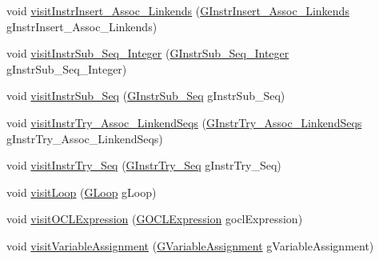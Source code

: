 \begin{DoxyCompactItemize}
\item 
void \hyperlink{interfaceorg_1_1tzi_1_1use_1_1gen_1_1assl_1_1statics_1_1_instruction_visitor_a6e62a3915d27cd213c38abfca067192c}{visit\-Instr\-Insert\-\_\-\-Assoc\-\_\-\-Linkends} (\hyperlink{classorg_1_1tzi_1_1use_1_1gen_1_1assl_1_1statics_1_1_g_instr_insert___assoc___linkends}{G\-Instr\-Insert\-\_\-\-Assoc\-\_\-\-Linkends} g\-Instr\-Insert\-\_\-\-Assoc\-\_\-\-Linkends)
\item 
void \hyperlink{interfaceorg_1_1tzi_1_1use_1_1gen_1_1assl_1_1statics_1_1_instruction_visitor_a6c045ef2d3ab3f0a5982d73a7479b4ca}{visit\-Instr\-Sub\-\_\-\-Seq\-\_\-\-Integer} (\hyperlink{classorg_1_1tzi_1_1use_1_1gen_1_1assl_1_1statics_1_1_g_instr_sub___seq___integer}{G\-Instr\-Sub\-\_\-\-Seq\-\_\-\-Integer} g\-Instr\-Sub\-\_\-\-Seq\-\_\-\-Integer)
\item 
void \hyperlink{interfaceorg_1_1tzi_1_1use_1_1gen_1_1assl_1_1statics_1_1_instruction_visitor_af2d112bc656a8c456464fcc2bfcefec6}{visit\-Instr\-Sub\-\_\-\-Seq} (\hyperlink{classorg_1_1tzi_1_1use_1_1gen_1_1assl_1_1statics_1_1_g_instr_sub___seq}{G\-Instr\-Sub\-\_\-\-Seq} g\-Instr\-Sub\-\_\-\-Seq)
\item 
void \hyperlink{interfaceorg_1_1tzi_1_1use_1_1gen_1_1assl_1_1statics_1_1_instruction_visitor_a6e0751ef8b22182d5e0e80addfdd4517}{visit\-Instr\-Try\-\_\-\-Assoc\-\_\-\-Linkend\-Seqs} (\hyperlink{classorg_1_1tzi_1_1use_1_1gen_1_1assl_1_1statics_1_1_g_instr_try___assoc___linkend_seqs}{G\-Instr\-Try\-\_\-\-Assoc\-\_\-\-Linkend\-Seqs} g\-Instr\-Try\-\_\-\-Assoc\-\_\-\-Linkend\-Seqs)
\item 
void \hyperlink{interfaceorg_1_1tzi_1_1use_1_1gen_1_1assl_1_1statics_1_1_instruction_visitor_a322b337943a58c59764574b767916a61}{visit\-Instr\-Try\-\_\-\-Seq} (\hyperlink{classorg_1_1tzi_1_1use_1_1gen_1_1assl_1_1statics_1_1_g_instr_try___seq}{G\-Instr\-Try\-\_\-\-Seq} g\-Instr\-Try\-\_\-\-Seq)
\item 
void \hyperlink{interfaceorg_1_1tzi_1_1use_1_1gen_1_1assl_1_1statics_1_1_instruction_visitor_a4cfcadfb5c8bb26c055af81274439262}{visit\-Loop} (\hyperlink{classorg_1_1tzi_1_1use_1_1gen_1_1assl_1_1statics_1_1_g_loop}{G\-Loop} g\-Loop)
\item 
void \hyperlink{interfaceorg_1_1tzi_1_1use_1_1gen_1_1assl_1_1statics_1_1_instruction_visitor_a72b26fb424428e63ec1fe1a473919ad2}{visit\-O\-C\-L\-Expression} (\hyperlink{classorg_1_1tzi_1_1use_1_1gen_1_1assl_1_1statics_1_1_g_o_c_l_expression}{G\-O\-C\-L\-Expression} gocl\-Expression)
\item 
void \hyperlink{interfaceorg_1_1tzi_1_1use_1_1gen_1_1assl_1_1statics_1_1_instruction_visitor_a830920f5dc0a43baf0f5d1ac065f81b0}{visit\-Variable\-Assignment} (\hyperlink{classorg_1_1tzi_1_1use_1_1gen_1_1assl_1_1statics_1_1_g_variable_assignment}{G\-Variable\-Assignment} g\-Variable\-Assignment)

\end{DoxyCompactItemize}
